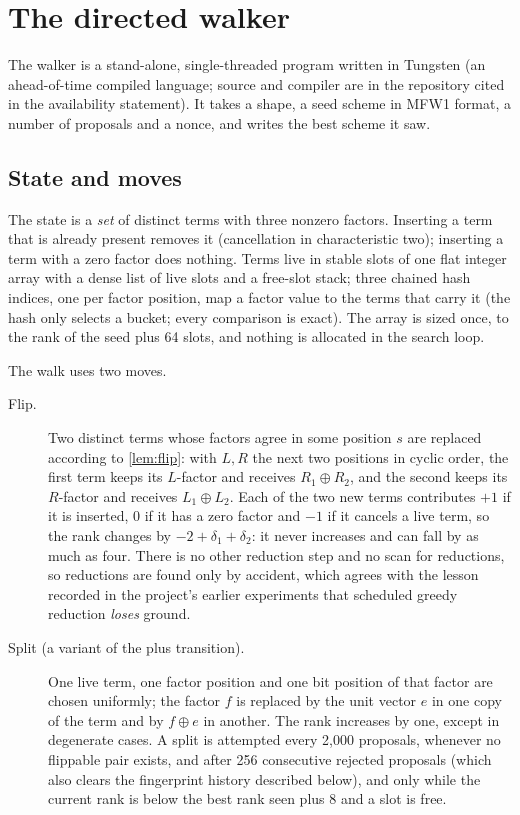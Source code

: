 \section{The directed walker}\label{sec:walker}

The walker is a stand-alone, single-threaded program written in Tungsten (an ahead-of-time compiled language;
source and compiler are in the repository cited in the availability statement). It takes a shape, a seed scheme in MFW1 format, a number of proposals
and a nonce, and writes the best scheme it saw.

\subsection{State and moves}
The state is a \emph{set} of distinct terms with three nonzero factors. Inserting a term that is already present removes it (cancellation
in characteristic two); inserting a term with a zero factor does nothing. Terms live in stable slots of one flat integer array with a
dense list of live slots and a free-slot stack; three chained hash indices, one per factor position, map a factor value to the terms that carry
it (the hash only selects a bucket; every comparison is exact). The array is sized once, to the rank of the seed plus 64 slots, and nothing is allocated in
the search loop.

The walk uses two moves.
\begin{description}
\item[Flip.] Two distinct terms whose factors agree in some position $s$ are replaced according to \cref{lem:flip}: with $L,R$ the
next two positions in cyclic order, the first term keeps its $L$-factor and receives $R_1\oplus R_2$, and the second keeps its
$R$-factor and receives $L_1\oplus L_2$. Each of the two new terms contributes $+1$ if it is inserted, $0$ if it has a zero factor and $-1$ if it cancels a live term, so the
rank changes by $-2+\delta_1+\delta_2$: it never increases and can fall by as much as four. There is no other reduction step and no scan for
reductions, so reductions are found only by accident, which agrees with the lesson recorded in the project's earlier experiments that
scheduled greedy reduction \emph{loses} ground.
\item[Split (a variant of the plus transition).] One live term, one factor position and one bit position of that factor are chosen uniformly; the factor
$f$ is replaced by the unit vector $e$ in one copy of the term and by $f\oplus e$ in another. The rank increases by one, except in
degenerate cases. A split is attempted every 2{,}000 proposals, whenever no flippable pair exists, and after 256 consecutive rejected proposals
(which also clears the fingerprint history described below), and only while the current rank is below the best rank seen plus 8 and a slot is free.
\end{description}

